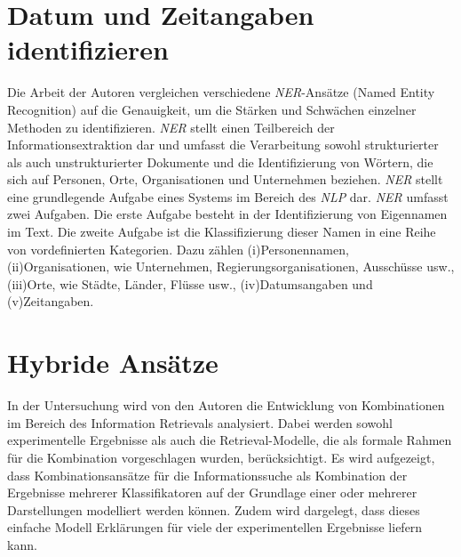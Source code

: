 \section{Datum und Zeitangaben identifizieren}
Die Arbeit \cite{mansouri2008named} der Autoren \citeauthor{mansouri2008named} vergleichen verschiedene \emph{NER}-Ansätze (Named Entity Recognition) auf die Genauigkeit, um die Stärken und Schwächen einzelner Methoden zu identifizieren. \emph{NER} stellt einen Teilbereich der Informationsextraktion dar und umfasst die Verarbeitung sowohl strukturierter als auch unstrukturierter Dokumente und die Identifizierung von Wörtern, die sich auf Personen, Orte, Organisationen und Unternehmen beziehen. \emph{NER} stellt eine grundlegende Aufgabe eines Systems im Bereich des \emph{NLP} dar. \emph{NER} umfasst zwei Aufgaben. Die erste Aufgabe besteht in der Identifizierung von Eigennamen im Text. Die zweite Aufgabe ist die Klassifizierung dieser Namen in eine Reihe von vordefinierten Kategorien. Dazu zählen (i)Personennamen, (ii)Organisationen, wie Unternehmen, Regierungsorganisationen, Ausschüsse usw., (iii)Orte, wie Städte, Länder, Flüsse usw., (iv)Datumsangaben und (v)Zeitangaben.\\
\section{Hybride Ansätze}
In der Untersuchung \cite{croft2000combining} wird von den Autoren \citeauthor{croft2000combining} die Entwicklung von Kombinationen im Bereich des Information Retrievals analysiert. Dabei werden sowohl experimentelle Ergebnisse als auch die Retrieval-Modelle, die als formale Rahmen für die Kombination vorgeschlagen wurden, berücksichtigt. Es wird aufgezeigt, dass Kombinationsansätze für die Informationssuche als Kombination der Ergebnisse mehrerer Klassifikatoren auf der Grundlage einer oder mehrerer Darstellungen modelliert werden können. Zudem wird dargelegt, dass dieses einfache Modell Erklärungen für viele der experimentellen Ergebnisse liefern kann.\\

